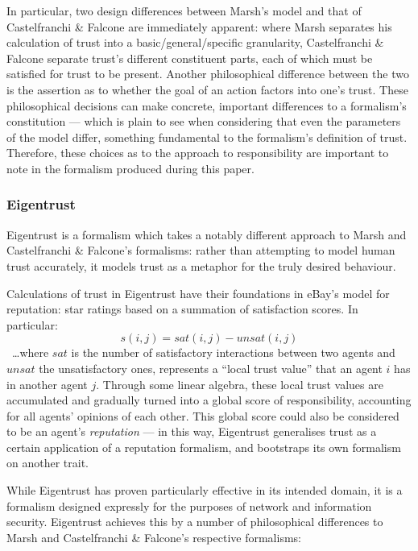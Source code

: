 In particular, two design differences between Marsh's model and that of Castelfranchi \& Falcone are immediately apparent: where Marsh separates his calculation of trust into a basic/general/specific granularity, Castelfranchi \& Falcone separate trust's different constituent parts, each of which must be satisfied for trust to be present. Another philosophical difference between the two is the assertion as to whether the goal of an action factors into one's trust. These philosophical decisions can make concrete, important differences to a formalism's constitution --- which is plain to see when considering that even the parameters of the model differ, something fundamental to the formalism's definition of trust. Therefore, these choices as to the approach to responsibility are important to note in the formalism produced during this paper.\par

\subsubsection{Eigentrust\cite{eigentrust}}
Eigentrust\cite{eigentrust} is a formalism which takes a notably different approach to Marsh and Castelfranchi \& Falcone's formalisms: rather than attempting to model human trust accurately, it models trust as a metaphor for the truly desired behaviour.\par

Calculations of trust in Eigentrust have their foundations in eBay's model for reputation: star ratings based on a summation of satisfaction scores. In particular: \[s(i,j) = sat(i,j) - unsat(i,j)\]~\ldots{}where \(sat\) is the number of satisfactory interactions between two agents and \(unsat\) the unsatisfactory ones, represents a ``local trust value'' that an agent \(i\) has in another agent \(j\). Through some linear algebra, these local trust values are accumulated and gradually turned into a global score of responsibility, accounting for all agents' opinions of each other. This global score could also be considered to be an agent's \emph{reputation} --- in this way, Eigentrust generalises trust as a certain application of a reputation formalism, and bootstraps its own formalism on another trait.\par

While Eigentrust has proven particularly effective in its intended domain, it is a formalism designed expressly for the purposes of network and information security. Eigentrust achieves this by a number of philosophical differences to Marsh and Castelfranchi \& Falcone's respective formalisms:

